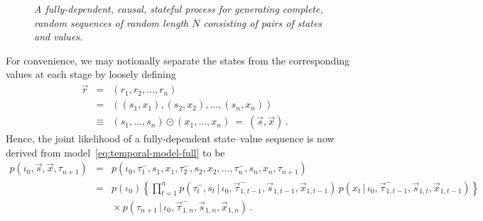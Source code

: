 \documentclass[a4paper]{article}
\newcommand{\vr}{\vec{r}}
\newcommand{\tm}{\tau^{-}}
\newcommand{\vs}{\vec{s}}
\newcommand{\vx}{\vec{x}}
\begin{document}
\begin{figure}[hbt]
\caption{\em A fully-dependent, causal, stateful process for generating complete, random sequences of random length $N$ consisting of pairs of states and values.}
\label{fig:stateful-full}
\end{figure}
For convenience, we may notionally separate the states from the corresponding values at each stage by loosely defining
\begin{eqnarray}
\vr & = & (r_1,r_2,\ldots,r_n)
\nonumber\\& = & 
((s_1,x_1),(s_2,x_2),\ldots,(s_n,x_n))
\nonumber\\& \equiv & 
(s_1,\ldots,s_n)\odot (x_1,\ldots,x_n)~=~(\vs,\vx)\,.
\end{eqnarray}
Hence, the joint likelihood of a fully-dependent state--value sequence is now derived from model~\eqref{eq:temporal-model-full} to be
\begin{eqnarray}
p(\iota_0,\vs,\vx,\tau_{n+1}) & = &
p(\iota_0,\tm_1,s_1,x_1,\tm_2,s_2,x_2,\ldots,\tm_n,s_n,x_n,\tau_{n+1})
\nonumber\\
& = &
p(\iota_0)
\left\{\prod_{t=1}^{n}p(\tm_t,s_t\,|\,\iota_0,\vec{\tau}^-_{1,t-1},\vs_{1,t-1},\vx_{1,t-1})\,p(x_t\,|\,\iota_0,\vec{\tau}^-_{1,t-1},\vs_{1,t},\vx_{1,t-1})\right\}
\nonumber\\&&{}\times
 p(\tau_{n+1}\,|\,\iota_0,\vec{\tau}^-_{1,n},\vs_{1,n},\vx_{1,n})
\,.
\label{eq:stateful-model-full}
\end{eqnarray}
\end{document}
